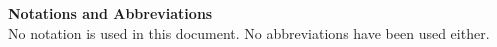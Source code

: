 

\clearpage %


\noindent

{\Huge{\bf{Notations and Abbreviations}}}\
\\[6pt] 




No notation is used in this document. No abbreviations have been used either.

\newpage






